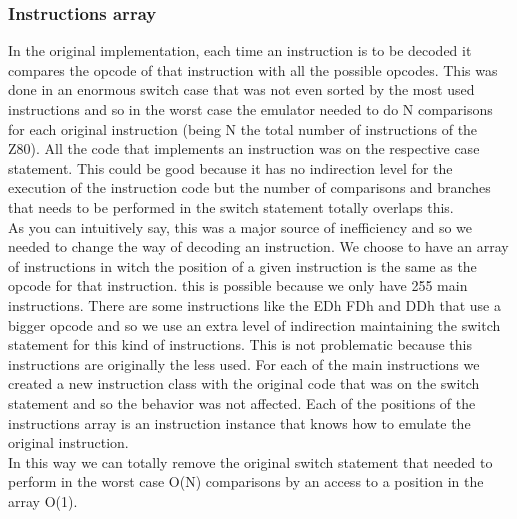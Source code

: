 \subsubsection{Instructions array}
In the original implementation, each time an instruction is to be decoded it compares the opcode of that instruction with all the possible opcodes. This was done in an enormous switch case that was not even sorted by the most used instructions and so in the worst case the emulator needed to do N comparisons for each original instruction (being N the total number of instructions of the Z80). All the code that implements an instruction was on the respective case statement. This could be good because it has no indirection level for the execution of the instruction code but the number of comparisons and branches that needs to be performed in the switch statement totally overlaps this.\\
\indent As you can intuitively say, this was a major source of inefficiency and so we needed to change the way of decoding an instruction.
We choose to have an array of instructions in witch the position of a given instruction is the same as the opcode for that instruction. this is possible because we only have 255 main instructions. There are some instructions like the EDh FDh and DDh that use a bigger opcode and so we use an extra level of indirection maintaining the switch statement for this kind of instructions. This is not problematic because this instructions are originally the less used.
For each of the main instructions we created a new instruction class with the original code that was on the switch statement and so the behavior was not affected. Each of the positions of the instructions array is an instruction instance that knows how to emulate the original instruction.\\
\indent In this way we can totally remove the original switch statement that needed to perform in the worst case O(N) comparisons by an access to a position in the array O(1).



